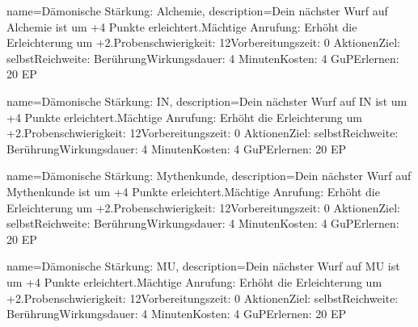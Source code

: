 {
    name={Dämonische Stärkung: Alchemie},
    description={Dein nächster Wurf auf Alchemie ist um +4 Punkte erleichtert.\newline Mächtige Anrufung: Erhöht die Erleichterung um +2.\newline Probenschwierigkeit: 12\newline Vorbereitungszeit: 0 Aktionen\newline Ziel: selbst\newline Reichweite: Berührung\newline Wirkungsdauer: 4 Minuten\newline Kosten: 4 GuP\newline Erlernen: 20 EP}
}


{
    name={Dämonische Stärkung: IN},
    description={Dein nächster Wurf auf IN ist um +4 Punkte erleichtert.\newline Mächtige Anrufung: Erhöht die Erleichterung um +2.\newline Probenschwierigkeit: 12\newline Vorbereitungszeit: 0 Aktionen\newline Ziel: selbst\newline Reichweite: Berührung\newline Wirkungsdauer: 4 Minuten\newline Kosten: 4 GuP\newline Erlernen: 20 EP}
}


{
    name={Dämonische Stärkung: Mythenkunde},
    description={Dein nächster Wurf auf Mythenkunde ist um +4 Punkte erleichtert.\newline Mächtige Anrufung: Erhöht die Erleichterung um +2.\newline Probenschwierigkeit: 12\newline Vorbereitungszeit: 0 Aktionen\newline Ziel: selbst\newline Reichweite: Berührung\newline Wirkungsdauer: 4 Minuten\newline Kosten: 4 GuP\newline Erlernen: 20 EP}
}


{
    name={Dämonische Stärkung: MU},
    description={Dein nächster Wurf auf MU ist um +4 Punkte erleichtert.\newline Mächtige Anrufung: Erhöht die Erleichterung um +2.\newline Probenschwierigkeit: 12\newline Vorbereitungszeit: 0 Aktionen\newline Ziel: selbst\newline Reichweite: Berührung\newline Wirkungsdauer: 4 Minuten\newline Kosten: 4 GuP\newline Erlernen: 20 EP}
}


